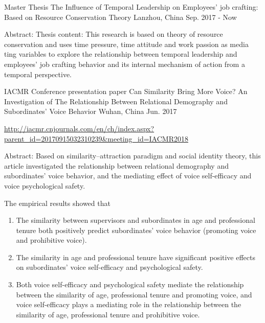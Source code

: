 \begin{cventries}
  \cventry
    {Master Thesis}
    {The Influence of Temporal Leadership on Employees' job crafting: Based on Resource Conservation Theory}
    {Lanzhou, China}
    {Sep. 2017 - Now}
    {
      \begin{cvitems}
        \item {Abstract: Thesis content: This research is based on theory of resource conservation and uses time pressure, time attitude and work passion as media ting variables to explore the relationship between temporal leadership and employees’ job crafting behavior and its internal mechanism of action from a temporal perspective.}
      \end{cvitems}
     }
  \cventry
    {IACMR Conference presentation paper}
    {Can Similarity Bring More Voice? An Investigation of The Relationship Between Relational Demography and Subordinates' Voice Behavior}
    {Wuhan, China}
    {Jun. 2017}
    {
      \begin{cvitems}
	\item {\url{http://iacmr.cnjournals.com/en/ch/index.aspx?parent_id=20170915032310239&meeting_id=IACMR2018}}
        \item {Abstract: Based on similarity–attraction paradigm and social identity theory, this article investigated the relationship between relational demography and subordinates' voice behavior, and the mediating effect of voice self-efficacy and voice psychological safety.}
	\item {The empirical results showed that}
	    \begin{enumerate}
	    \item {The similarity between supervisors and subordinates in age and professional tenure both positively predict subordinates' voice behavior (promoting voice and prohibitive voice).}
	    \item {The similarity in age and professional tenure have significant positive effects on subordinates' voice self-efficacy and psychological safety.}
	    \item {Both voice self-efficacy and psychological safety mediate the relationship between the similarity of age, professional tenure and promoting voice, and voice self-efficacy plays a mediating role in the relationship between the similarity of age, professional tenure and prohibitive voice.}
	    \end{enumerate}
      \end{cvitems}
     }
  \cventry

\end{cventries}
